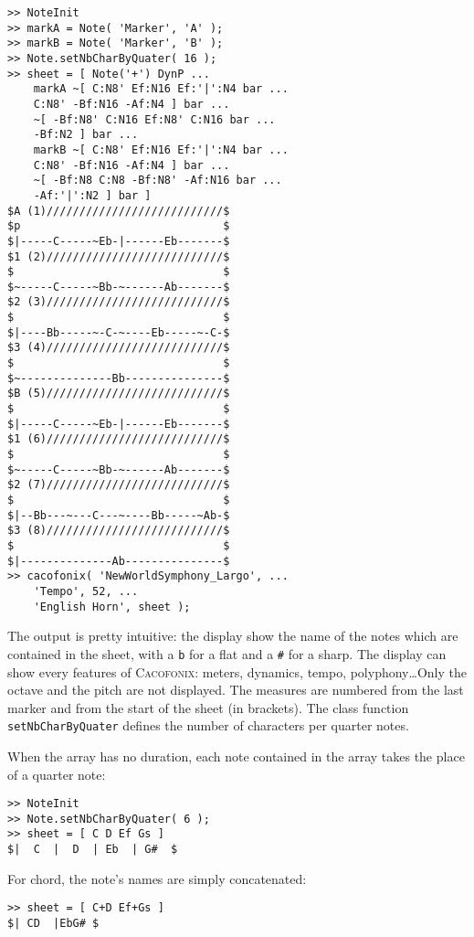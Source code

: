 \documentclass{article}
\newcommand{\cacofonix}{\textsc{Cacofonix}\xspace}
\begin{document}
\begin{lstlisting}
>> NoteInit
>> markA = Note( 'Marker', 'A' );
>> markB = Note( 'Marker', 'B' );
>> Note.setNbCharByQuater( 16 );
>> sheet = [ Note('+') DynP ...
	markA ~[ C:N8' Ef:N16 Ef:'|':N4 bar ...
	C:N8' -Bf:N16 -Af:N4 ] bar ...
	~[ -Bf:N8' C:N16 Ef:N8' C:N16 bar ...
	-Bf:N2 ] bar ...
	markB ~[ C:N8' Ef:N16 Ef:'|':N4 bar ...
	C:N8' -Bf:N16 -Af:N4 ] bar ...
	~[ -Bf:N8 C:N8 -Bf:N8' -Af:N16 bar ...
	-Af:'|':N2 ] bar ]
$A (1)///////////////////////////$
$p                               $
$|-----C-----~Eb-|------Eb-------$
$1 (2)///////////////////////////$
$                                $
$~-----C-----~Bb-~------Ab-------$
$2 (3)///////////////////////////$
$                                $
$|----Bb-----~-C-~----Eb-----~-C-$
$3 (4)///////////////////////////$
$                                $
$~--------------Bb---------------$
$B (5)///////////////////////////$
$                                $
$|-----C-----~Eb-|------Eb-------$
$1 (6)///////////////////////////$
$                                $
$~-----C-----~Bb-~------Ab-------$
$2 (7)///////////////////////////$
$                                $
$|--Bb---~---C---~----Bb-----~Ab-$
$3 (8)///////////////////////////$
$                                $
$|--------------Ab---------------$
>> cacofonix( 'NewWorldSymphony_Largo', ...
	'Tempo', 52, ...
	'English Horn', sheet );
\end{lstlisting}

The output is pretty intuitive: the display show the name of the notes which are contained in the sheet, with a \lstinline!b! for a flat and a \lstinline!#! for a sharp. The display can show every features of \cacofonix: meters, dynamics, tempo, polyphony\dots Only the octave and the pitch are not displayed. The measures are numbered from the last marker and from the start of the sheet (in brackets). The class function \lstinline!setNbCharByQuater! defines the number of characters per quarter notes.

When the array has no duration, each note contained in the array takes the place of a quarter note:
\begin{lstlisting}
>> NoteInit
>> Note.setNbCharByQuater( 6 );
>> sheet = [ C D Ef Gs ]
$|  C  |  D  | Eb  | G#  $
\end{lstlisting}

For chord, the note's names are simply concatenated:
\begin{lstlisting}
>> sheet = [ C+D Ef+Gs ]
$| CD  |EbG# $
\end{lstlisting}
\end{document}
